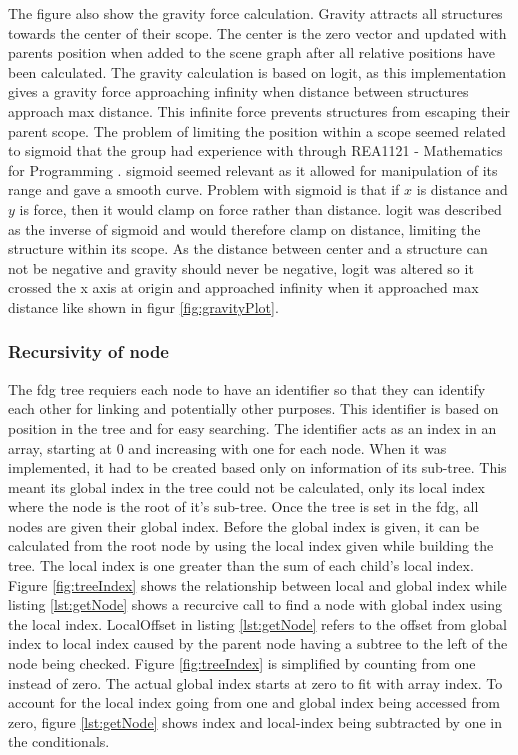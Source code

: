 
The figure also show the gravity force calculation. Gravity attracts all structures towards the center of their scope. The center is the zero vector and updated with parents position when added to the scene graph after all relative positions have been calculated. The gravity calculation is based on \gls{logit}, as this implementation gives a gravity force approaching infinity when distance between structures approach max distance. This infinite force prevents structures from escaping their parent scope. The problem of limiting the position within a scope seemed related to \gls{sigmoid} that the group had experience with through REA1121 - Mathematics for Programming \cite{course:progMath}. \Gls{sigmoid} seemed relevant as it allowed for manipulation of its range and gave a smooth curve. Problem with \gls{sigmoid} is that if $x$ is distance and $y$ is force, then it would clamp on force rather than distance. \gls{logit} was described as the inverse of \gls{sigmoid} and would therefore clamp on distance, limiting the structure within its scope. As the distance between center and a structure can not be negative and gravity should never be negative, \gls{logit} was altered so it crossed the x axis at origin and approached infinity when it approached max distance like shown in figur \ref{fig:gravityPlot}.

\subsubsection{Recursivity of node}
\label{subsubsec:recuriviryOfNode}


The \gls{fdg} tree requiers each node to have an identifier so that they can identify each other for linking and potentially other purposes. This identifier is based on position in the tree and for easy searching. The identifier acts as an index in an array, starting at 0 and increasing with one for each node. When it was implemented, it had to be created based only on information of its sub-tree. This meant its global index in the tree could not be calculated, only its local index where the node is the root of it's sub-tree. Once the tree is set in the \gls{fdg}, all nodes are given their global index. Before the global index is given, it can be calculated from the root node by using the local index given while building the tree. The local index is one greater than the sum of each child's local index. Figure \ref{fig:treeIndex} shows the relationship between local and global index while listing \ref{lst:getNode} shows a recurcive call to find a node with global index using the local index. LocalOffset in listing \ref{lst:getNode} refers to the offset from global index to local index caused by the parent node having a subtree to the left of the node being checked. Figure \ref{fig:treeIndex} is simplified by counting from  one instead of zero. The actual global index starts at zero to fit with array index. To account for the local index going from one and global index being accessed from zero, figure \ref{lst:getNode} shows index and local-index being subtracted by one in the conditionals.

